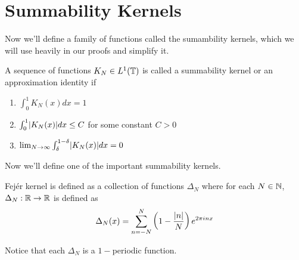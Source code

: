   \section{Summability Kernels}
  Now we'll define a family of functions called the sumambility kernels, which we will use heavily in our proofs and simplify it.
  \begin{definition}
    \label{def:summability_kernel}
    A sequence of functions $K_N \in L^1(\mathbb T)$ is called a summability kernel or an approximation identity if 
    \begin{enumerate}[label=(\alph*)]
      \item $\int_{0}^{1}K_N(x)dx = 1$
      \item $\int_{0}^{1}\lvert K_N(x)\rvert dx \le C$ for some constant $C>0$
      \item $\lim_{N\to\infty} \int_{\delta}^{1-\delta}\lvert K_N(x)\rvert dx= 0$
    \end{enumerate}
  \end{definition}
 

  Now we'll define one of the important summability kernels.
  \begin{definition}
    \label{def:fejer_kernel}
    Fej\'er kernel is defined as a collection of functions  $\Delta_N$ where for each $N \in \mathbb N$, $\Delta_N : \mathbb R \to \mathbb R$ is defined as 
    \begin{displaymath}
      \Delta_N(x) = \sum_{n=-N}^{N}\left( 1 - \frac{\lvert n\rvert}{N}\right)e^{2\pi inx}
    \end{displaymath}
  \end{definition}
  Notice that each $\Delta_N$ is a $1-$periodic function.

